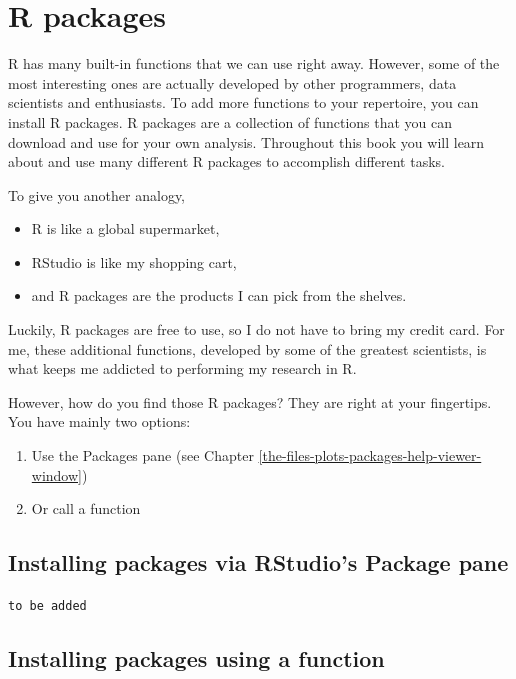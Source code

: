 \documentclass[
]{book}
\providecommand{\tightlist}{%
  \setlength{\itemsep}{0pt}\setlength{\parskip}{0pt}}
\begin{document}
\hypertarget{r-packages}{%
\section{R packages}\label{r-packages}}

R has many built-in functions that we can use right away. However, some of the most interesting ones are actually developed by other programmers, data scientists and enthusiasts. To add more functions to your repertoire, you can install R packages. R packages are a collection of functions that you can download and use for your own analysis. Throughout this book you will learn about and use many different R packages to accomplish different tasks.

To give you another analogy,

\begin{itemize}
\item
  R is like a global supermarket,
\item
  RStudio is like my shopping cart,
\item
  and R packages are the products I can pick from the shelves.
\end{itemize}

Luckily, R packages are free to use, so I do not have to bring my credit card. For me, these additional functions, developed by some of the greatest scientists, is what keeps me addicted to performing my research in R.

However, how do you find those R packages? They are right at your fingertips. You have mainly two options:

\begin{enumerate}
\def\labelenumi{\arabic{enumi}.}
\tightlist
\item
  Use the Packages pane (see Chapter \ref{the-files-plots-packages-help-viewer-window})
\item
  Or call a function
\end{enumerate}

\hypertarget{installing-packages-via-rstudios-package-pane}{%
\subsection{Installing packages via RStudio's Package pane}\label{installing-packages-via-rstudios-package-pane}}

\texttt{to\ be\ added}

\hypertarget{installing-packages-using-a-function}{%
\subsection{Installing packages using a function}\label{installing-packages-using-a-function}}
\end{document}
